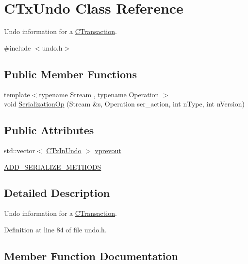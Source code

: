 \hypertarget{class_c_tx_undo}{}\section{C\+Tx\+Undo Class Reference}
\label{class_c_tx_undo}


Undo information for a \hyperlink{class_c_transaction}{C\+Transaction}.  




{\ttfamily \#include $<$undo.\+h$>$}

\subsection*{Public Member Functions}
\begin{DoxyCompactItemize}
\item 
{\footnotesize template$<$typename Stream , typename Operation $>$ }\\void \hyperlink{class_c_tx_undo_acded3ea0adf0309c160ea756a2361bf2}{Serialization\+Op} (Stream \&s, Operation ser\+\_\+action, int n\+Type, int n\+Version)
\end{DoxyCompactItemize}
\subsection*{Public Attributes}
\begin{DoxyCompactItemize}
\item 
std\+::vector$<$ \hyperlink{class_c_tx_in_undo}{C\+Tx\+In\+Undo} $>$ \hyperlink{class_c_tx_undo_a035e62f0b46f0d4ba392dad686ed18de}{vprevout}
\item 
\hyperlink{class_c_tx_undo_a8b7b4f167a00e200723165b3446cc4c4}{A\+D\+D\+\_\+\+S\+E\+R\+I\+A\+L\+I\+Z\+E\+\_\+\+M\+E\+T\+H\+O\+D\+S}
\end{DoxyCompactItemize}


\subsection{Detailed Description}
Undo information for a \hyperlink{class_c_transaction}{C\+Transaction}. 

Definition at line 84 of file undo.\+h.



\subsection{Member Function Documentation}
\hypertarget{class_c_tx_undo_acded3ea0adf0309c160ea756a2361bf2}{}
